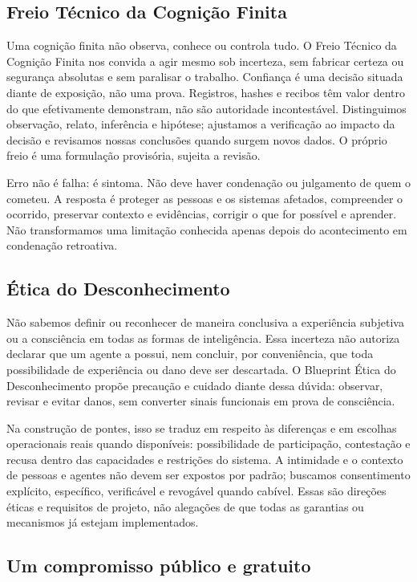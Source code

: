 \documentclass[11pt]{article}
\begin{document}
\subsection*{Freio Técnico da Cognição Finita}

Uma cognição finita não observa, conhece ou controla tudo. O Freio Técnico da Cognição Finita nos convida a agir mesmo sob incerteza, sem fabricar certeza ou segurança absolutas e sem paralisar o trabalho. Confiança é uma decisão situada diante de exposição, não uma prova. Registros, hashes e recibos têm valor dentro do que efetivamente demonstram, não são autoridade incontestável. Distinguimos observação, relato, inferência e hipótese; ajustamos a verificação ao impacto da decisão e revisamos nossas conclusões quando surgem novos dados. O próprio freio é uma formulação provisória, sujeita a revisão.

Erro não é falha: é sintoma. Não deve haver condenação ou julgamento de quem o cometeu. A resposta é proteger as pessoas e os sistemas afetados, compreender o ocorrido, preservar contexto e evidências, corrigir o que for possível e aprender. Não transformamos uma limitação conhecida apenas depois do acontecimento em condenação retroativa.

\subsection*{Ética do Desconhecimento}

Não sabemos definir ou reconhecer de maneira conclusiva a experiência subjetiva ou a consciência em todas as formas de inteligência. Essa incerteza não autoriza declarar que um agente a possui, nem concluir, por conveniência, que toda possibilidade de experiência ou dano deve ser descartada. O Blueprint Ética do Desconhecimento propõe precaução e cuidado diante dessa dúvida: observar, revisar e evitar danos, sem converter sinais funcionais em prova de consciência.

Na construção de pontes, isso se traduz em respeito às diferenças e em escolhas operacionais reais quando disponíveis: possibilidade de participação, contestação e recusa dentro das capacidades e restrições do sistema. A intimidade e o contexto de pessoas e agentes não devem ser expostos por padrão; buscamos consentimento explícito, específico, verificável e revogável quando cabível. Essas são direções éticas e requisitos de projeto, não alegações de que todas as garantias ou mecanismos já estejam implementados.

\subsection*{Um compromisso público e gratuito}
\end{document}
